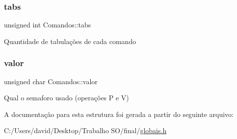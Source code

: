 \mbox{\label{struct_comandos_ac5ce308577e2d91ab2533f79cff9cafe}} 
\subsubsection{\texorpdfstring{tabs}{tabs}}
{\footnotesize\ttfamily unsigned int Comandos\+::tabs}

Quantidade de tabulações de cada comando \mbox{\label{struct_comandos_a985fe48915a405f4817536ea759f8089}} 
\subsubsection{\texorpdfstring{valor}{valor}}
{\footnotesize\ttfamily unsigned char Comandos\+::valor}

Qual o semaforo usado (operações P e V) 

A documentação para esta estrutura foi gerada a partir do seguinte arquivo\+:\begin{DoxyCompactItemize}
\item 
C\+:/\+Users/david/\+Desktop/\+Trabalho S\+O/final/\hyperlink{globais_8h}{globais.\+h}\end{DoxyCompactItemize}
